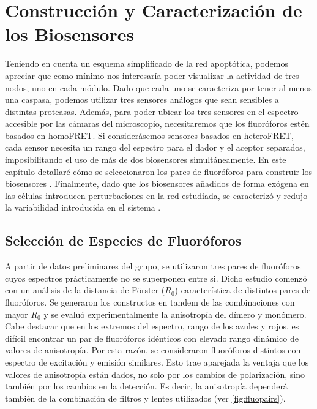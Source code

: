 \chapter{Construcción y Caracterización de los Biosensores}
\label{cap:Biosensores}

Teniendo en cuenta un esquema simplificado de la red apoptótica, podemos apreciar que como mínimo nos interesaría poder visualizar la actividad de tres nodos, uno en cada módulo. Dado que cada uno se caracteriza por tener al menos una caspasa, podemos utilizar tres sensores análogos que sean sensibles a distintas proteasas. Además, para poder ubicar los tres sensores en el espectro accesible por las cámaras del microscopio, necesitaremos que los fluoróforos estén basados en homoFRET. Si considerásemos sensores basados en heteroFRET, cada sensor necesita un rango del espectro para el dador y el aceptor separados, imposibilitando el uso de más de dos biosensores simultáneamente. En este capítulo detallaré cómo se seleccionaron los pares de fluoróforos para construir los biosensores \citep{Corbat2018}. Finalmente, dado que los biosensores añadidos de forma exógena en las células introducen perturbaciones en la red estudiada, se caracterizó y redujo la variabilidad introducida en el sistema \citep{Habif2021}.

\section{Selección de Especies de Fluoróforos}

A partir de datos preliminares del grupo, se utilizaron tres pares de fluoróforos cuyos espectros prácticamente no se superponen entre si. Dicho estudio comenzó con un análisis de la distancia de Förster ($R_0$) característica de distintos pares de fluoróforos. Se generaron los constructos en tandem de las combinaciones con mayor $R_0$ y se evaluó experimentalmente la anisotropía del dímero y monómero. Cabe destacar que en los extremos del espectro, rango de los azules y rojos, es difícil encontrar un par de fluoróforos idénticos con elevado rango dinámico de valores de anisotropía. Por esta razón, se consideraron fluoróforos distintos con espectro de excitación y emisión similares. Esto trae aparejada la ventaja que los valores de anisotropía están dados, no solo por los cambios de polarización, sino también por los cambios en la detección. Es decir, la anisotropía dependerá también de la combinación de filtros y lentes utilizados (ver \cref{fig:fluopairs}).

